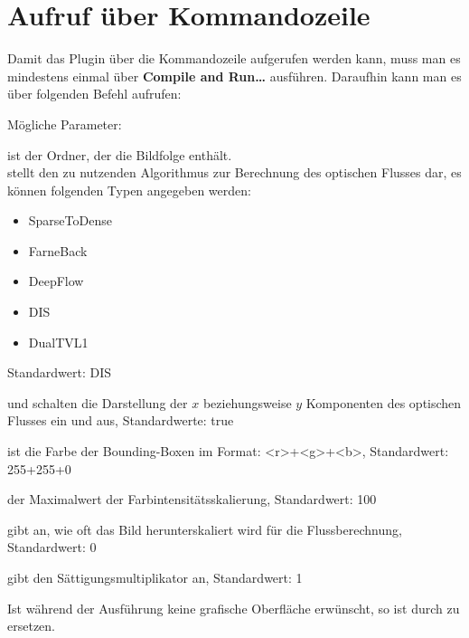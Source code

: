 \section{Aufruf über Kommandozeile}

Damit das Plugin über die Kommandozeile aufgerufen werden kann, muss man es mindestens einmal über \textbf{Compile and Run\dots} ausführen. Daraufhin kann man es über folgenden Befehl aufrufen:



Mögliche Parameter:

 ist der Ordner, der die Bildfolge enthält.
 \\

 stellt den zu nutzenden Algorithmus zur Berechnung des optischen Flusses dar, es können folgenden Typen angegeben werden:

\begin{itemize}
\item SparseToDense
\item FarneBack
\item DeepFlow
\item DIS
\item DualTVL1
\end{itemize}

Standardwert: DIS 

 und  schalten die Darstellung der $x$ beziehungsweise $y$ Komponenten des optischen Flusses ein und aus, Standardwerte: true

 ist die Farbe der Bounding-Boxen im Format: <r>+<g>+<b>, Standardwert: 255+255+0

 der Maximalwert der Farbintensitätsskalierung, Standardwert: 100

 gibt an, wie oft das Bild herunterskaliert wird für die Flussberechnung, Standardwert: 0

 gibt den Sättigungsmultiplikator an, Standardwert: 1


Ist während der Ausführung keine grafische Oberfläche erwünscht, so ist  durch  zu ersetzen.